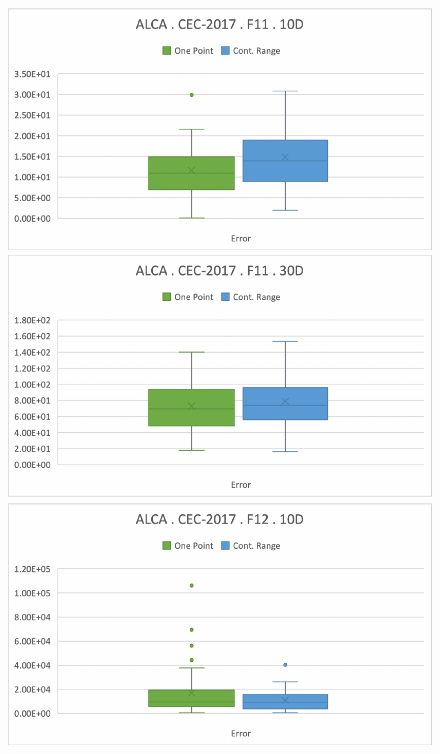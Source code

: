 \documentclass[graybox]{svmult}
\begin{document}
    \begin{figure}[!ht]
        \begin{minipage}[h]{0.49\linewidth}
            \includegraphics[width=1\linewidth]{img/fig_experiment_F11x10D.pdf} 
        \end{minipage}
        \hfill
        \begin{minipage}[h]{0.49\linewidth}
            \includegraphics[width=1\linewidth]{img/fig_experiment_F11x30D.pdf} 
        \end{minipage}
        \vfill
        \vspace{0.05 cm}
        \begin{minipage}[h]{0.49\linewidth}
            \includegraphics[width=1\linewidth]{img/fig_experiment_F12x10D.pdf} 

\end{minipage}
\end{figure}
\end{document}
